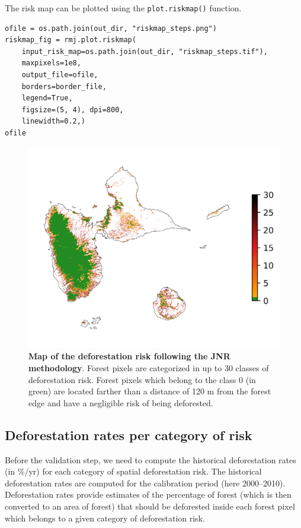 \documentclass[paper=a4, 12pt, DIV=12]{scrartcl}
\begin{document}
The risk map can be plotted using the \texttt{plot.riskmap()} function.

\begin{verbatim}
ofile = os.path.join(out_dir, "riskmap_steps.png")
riskmap_fig = rmj.plot.riskmap(
    input_risk_map=os.path.join(out_dir, "riskmap_steps.tif"),
    maxpixels=1e8,
    output_file=ofile,
    borders=border_file,
    legend=True,
    figsize=(5, 4), dpi=800,
    linewidth=0.2,)
ofile
\end{verbatim}

\begin{figure}[H]
\centering
\includegraphics[width=0.8\linewidth]{outputs/riskmap_steps.png}
\caption{\label{fig:org0d68add}\textbf{Map of the deforestation risk following the JNR methodology}. Forest pixels are categorized in up to 30 classes of deforestation risk. Forest pixels which belong to the class 0 (in green) are located farther than a distance of 120 m from the forest edge and have a negligible risk of being deforested.}
\end{figure}

\subsection{Deforestation rates per category of risk}
\label{sec:orgdd28805}

Before the validation step, we need to compute the historical deforestation rates (in \%/yr) for each category of spatial deforestation risk. The historical deforestation rates are computed for the calibration period (here 2000--2010). Deforestation rates provide estimates of the percentage of forest (which is then converted to an area of forest) that should be deforested inside each forest pixel which belongs to a given category of deforestation risk.
\end{document}
